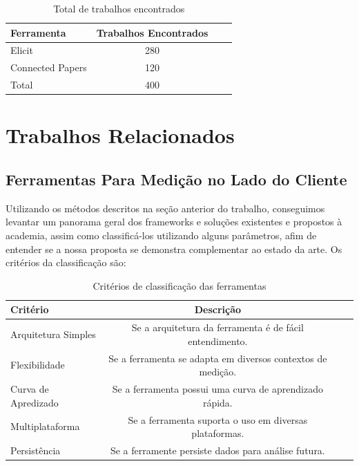 \documentclass[12pt]{tcc}
\begin{document}
\begin{table}[!ht]
	\centering
	\caption{Total de trabalhos encontrados}
	\begin{tabular}{l  c L{1.5cm} R{1.5cm}}
		\toprule
		\textbf{Ferramenta} & \textbf{Trabalhos Encontrados} \\
		\midrule
		Elicit  &  280  \\
		Connected Papers  &  120  \\
		\midrule
		Total  &  400  \\
		\bottomrule
	\end{tabular}
	\label{tab:trabalhos-encontrados}
\end{table}

\chapter{Trabalhos Relacionados}
\label{sec:trabalhos_relacionados}
	\label{sec:trab_relacionados}

	\section{Ferramentas Para Medição no Lado do Cliente}
	Utilizando os métodos descritos na seção anterior do trabalho, conseguimos levantar um panorama geral dos frameworks e soluções existentes e propostos à academia, assim como classificá-los utilizando alguns parâmetros, afim de entender se a nossa proposta se demonstra complementar ao estado da arte. 
	Os critérios da classificação são: 


	\begin{table}[!ht]
		\centering
		\caption{Critérios de classificação das ferramentas}
		\begin{tabular}{l c L{1.5cm} R{1.5cm}}
			\toprule
			\textbf{Critério} & \textbf{Descrição}\\
			\midrule 
			Arquitetura Simples & Se a arquitetura da ferramenta é de fácil entendimento.\\
			Flexibilidade&Se a ferramenta se adapta em diversos contextos de medição.\\
			Curva de Apredizado&Se a ferramenta possui uma curva de aprendizado rápida.\\
			Multiplataforma&Se a ferramenta suporta o uso em diversas plataformas.\\
			Persistência&Se a ferramente persiste dados para análise futura.\\
			\bottomrule
		\end{tabular}
		\label{tab:string-busca-connected-papers}
	\end{table}
\end{document}
